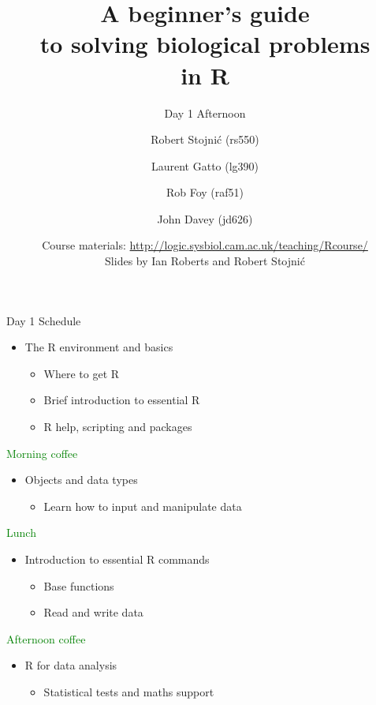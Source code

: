 \documentclass{beamer}
\title[Cambridge R Course]{A beginner's guide\\to solving biological problems\\in R}
\subtitle{Day 1 Afternoon\\}
\author[]{Robert Stojni\'{c} (rs550) \and Laurent Gatto (lg390) \and Rob Foy (raf51) \and John Davey (jd626)}
\date[]{Course materials: \url{http://logic.sysbiol.cam.ac.uk/teaching/Rcourse/}\\Slides by Ian Roberts and Robert Stojni\'{c}}
\begin{document}
\begin{frame}
    \titlepage
\end{frame}


\begin{frame}{Day 1 Schedule}

\begin{itemize}
  \item The R environment and basics
  \begin{itemize}
      \item Where to get R
      \item Brief introduction to essential R
      \item R help, scripting and packages
  \end{itemize}
\end{itemize}
\textcolor{green}{Morning coffee}
\begin{itemize}
  \item Objects and data types
  \begin{itemize}
      \item Learn how to input and manipulate data
  \end{itemize}
\end{itemize}
\textcolor{green}{Lunch}
\begin{itemize}
    \item Introduction to essential R commands
    \begin{itemize}
        \item Base functions
        \item Read and write data
    \end{itemize}
\end{itemize}
\textcolor{green}{Afternoon coffee}
\begin{itemize}
    \item R for data analysis
    \begin{itemize}
        \item Statistical tests and maths support
    \end{itemize}
\end{itemize}

\end{frame}
\end{document}
